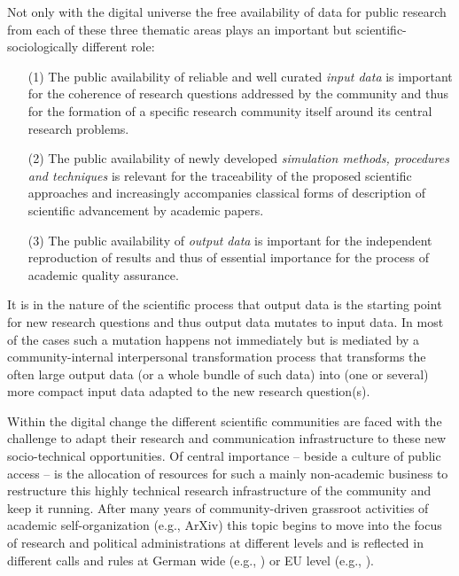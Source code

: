 \documentclass[runningheads,a4paper]{llncs}
\begin{document}
Not only with the digital universe the free availability of data for public
research from each of these three thematic areas plays an important but
scientific-sociologically different role:
\begin{enumerate}
\item [(1)] The public availability of reliable and well curated \emph{input
  data} is important for the coherence of research questions addressed by the
  community and thus for the formation of a specific research community itself
  around its central research problems.
\item [(2)] The public availability of newly developed \emph{simulation
  methods, procedures and techniques} is relevant for the traceability of the
  proposed scientific approaches and increasingly accompanies classical forms
  of description of scientific advancement by academic papers.
\item [(3)] The public availability of \emph{output data} is important for the
  independent reproduction of results and thus of essential importance for the
  process of academic quality assurance.
\end{enumerate}
It is in the nature of the scientific process that output data is the starting
point for new research questions and thus output data mutates to input data. In
most of the cases such a mutation happens not immediately but is mediated by a
community-internal interpersonal transformation process that transforms the
often large output data (or a whole bundle of such data) into (one or several)
more compact input data adapted to the new research question(s).

Within the digital change the different scientific communities are faced with
the challenge to adapt their research and communication infrastructure to these
new socio-technical opportunities. Of central importance -- beside a culture of
public access -- is the allocation of resources for such a mainly non-academic
business to restructure this highly technical research infrastructure of the
community and keep it running. After many years of community-driven grassroot
activities of academic self-organization (e.g., ArXiv) this topic begins to
move into the focus of research and political administrations at different
levels and is reflected in different calls and rules at German wide (e.g.,
\cite{dfg-fd}) or EU level (e.g., \cite{h2020,esfri}).
\end{document}
